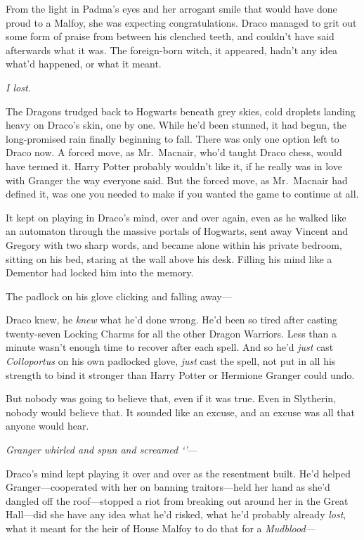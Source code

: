 From the light in Padma's eyes and her arrogant smile that would have done proud to a Malfoy, she was expecting congratulations. Draco managed to grit out some form of praise from between his clenched teeth, and couldn't have said afterwards what it was. The foreign-born witch, it appeared, hadn't any idea what'd happened, or what it meant.

\emph{I lost.}

The Dragons trudged back to Hogwarts beneath grey skies, cold droplets landing heavy on Draco's skin, one by one. While he'd been stunned, it had begun, the long-promised rain finally beginning to fall. There was only one option left to Draco now. A forced move, as Mr.~Macnair, who'd taught Draco chess, would have termed it. Harry Potter probably wouldn't like it, if he really was in love with Granger the way everyone said. But the forced move, as Mr.~Macnair had defined it, was one you needed to make if you wanted the game to continue at all.

It kept on playing in Draco's mind, over and over again, even as he walked like an automaton through the massive portals of Hogwarts, sent away Vincent and Gregory with two sharp words, and became alone within his private bedroom, sitting on his bed, staring at the wall above his desk. Filling his mind like a Dementor had locked him into the memory.

The padlock on his glove clicking and falling away—

Draco knew, he \emph{knew} what he'd done wrong. He'd been so tired after casting twenty-seven Locking Charms for all the other Dragon Warriors. Less than a minute wasn't enough time to recover after each spell. And so he'd \emph{just} cast \emph{Colloportus} on his own padlocked glove, \emph{just} cast the spell, not put in all his strength to bind it stronger than Harry Potter or Hermione Granger could undo.

But nobody was going to believe that, even if it was true. Even in Slytherin, nobody would believe that. It sounded like an excuse, and an excuse was all that anyone would hear.

\emph{Granger whirled and spun and screamed `'}—

Draco's mind kept playing it over and over as the resentment built. He'd helped Granger—cooperated with her on banning traitors—held her hand as she'd dangled off the roof—stopped a riot from breaking out around her in the Great Hall—did she have any idea what he'd risked, what he'd probably already \emph{lost}, what it meant for the heir of House Malfoy to do that for a \emph{Mudblood}—

